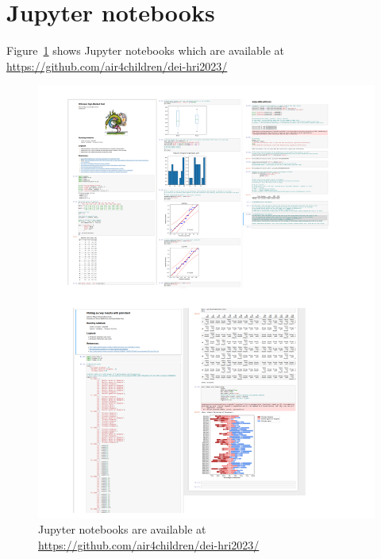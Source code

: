 \documentclass[sigconf]{acmart}
\begin{document}
\section*{Jupyter notebooks}
Figure~\ref{fig:notebooks} shows Jupyter notebooks which are available at \\ \url{https://github.com/air4children/dei-hri2023/}
\begin{figure}[h]
  \centering
    \includegraphics[width=\linewidth]{fig-jupyter-notebooks.png}  %
    \caption{
    Jupyter notebooks are available at \url{https://github.com/air4children/dei-hri2023/}
    }
    \label{fig:notebooks}
\end{figure}

%

%
%
\end{document}
